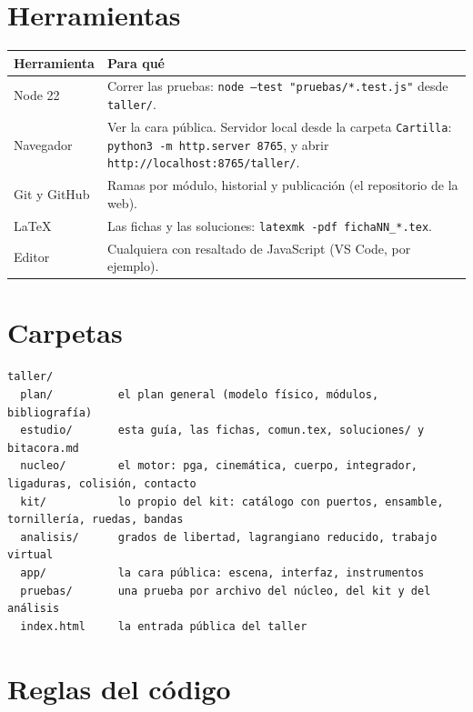 \documentclass[11pt,a4paper]{article}
\begin{document}
\section{Herramientas}

\begin{tabularx}{\linewidth}{@{}l Y@{}}
\toprule
\textbf{Herramienta} & \textbf{Para qué}\\
\midrule
Node 22 & Correr las pruebas: \texttt{node --test "pruebas/*.test.js"} desde \texttt{taller/}.\\
Navegador & Ver la cara pública. Servidor local desde la carpeta \texttt{Cartilla}:
  \texttt{python3 -m http.server 8765}, y abrir \texttt{http://localhost:8765/taller/}.\\
Git y GitHub & Ramas por módulo, historial y publicación (el repositorio de la web).\\
LaTeX & Las fichas y las soluciones: \texttt{latexmk -pdf fichaNN\_*.tex}.\\
Editor & Cualquiera con resaltado de JavaScript (VS Code, por ejemplo).\\
\bottomrule
\end{tabularx}

\section{Carpetas}

\begin{lstlisting}
taller/
  plan/          el plan general (modelo físico, módulos, bibliografía)
  estudio/       esta guía, las fichas, comun.tex, soluciones/ y bitacora.md
  nucleo/        el motor: pga, cinemática, cuerpo, integrador, ligaduras, colisión, contacto
  kit/           lo propio del kit: catálogo con puertos, ensamble, tornillería, ruedas, bandas
  analisis/      grados de libertad, lagrangiano reducido, trabajo virtual
  app/           la cara pública: escena, interfaz, instrumentos
  pruebas/       una prueba por archivo del núcleo, del kit y del análisis
  index.html     la entrada pública del taller
\end{lstlisting}

\section{Reglas del código}
\end{document}

